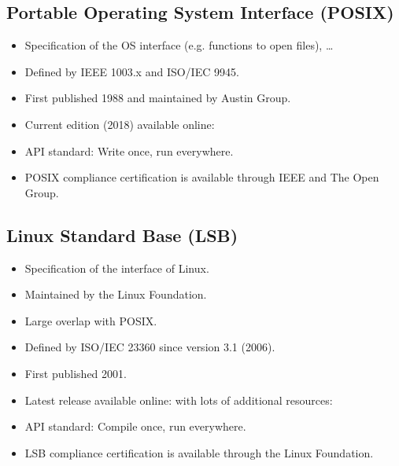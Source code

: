         \subsection{Portable Operating System Interface (POSIX)}
            \begin{itemize}
            	\item Specification of the OS interface (e.g. functions to open files), \dots
            	\item Defined by IEEE 1003.x and ISO/IEC 9945.
            	\item First published 1988 and maintained by Austin Group.
            	\item Current edition (2018) available online: 
            	\item API standard: Write once, run everywhere.
            	\item POSIX compliance certification is available through IEEE and The Open Group.
            \end{itemize}

        \subsection{Linux Standard Base (LSB)}
            \begin{itemize}
            	\item Specification of the interface of Linux.
            	\item Maintained by the Linux Foundation.
            	\item Large overlap with POSIX.
            	\item Defined by ISO/IEC 23360 since version 3.1 (2006).
            	\item First published 2001.
            	\item Latest release available online:  with lots of additional resources: 
            	\item API standard: Compile once, run everywhere.
            	\item LSB compliance certification is available through the Linux Foundation.
            \end{itemize}

